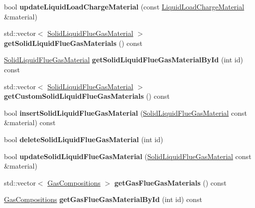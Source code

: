 \begin{DoxyCompactItemize}
bool {\bfseries update\+Liquid\+Load\+Charge\+Material} (const \hyperlink{class_liquid_load_charge_material}{Liquid\+Load\+Charge\+Material} \&material)
\item 
\mbox{\label{class_s_q_lite_aecba5bffe035af787b17b5bf5997d825}} 
std\+::vector$<$ \hyperlink{class_solid_liquid_flue_gas_material}{Solid\+Liquid\+Flue\+Gas\+Material} $>$ {\bfseries get\+Solid\+Liquid\+Flue\+Gas\+Materials} () const
\item 
\mbox{\label{class_s_q_lite_aa7ea5aa679227d695fe38848236281ee}} 
\hyperlink{class_solid_liquid_flue_gas_material}{Solid\+Liquid\+Flue\+Gas\+Material} {\bfseries get\+Solid\+Liquid\+Flue\+Gas\+Material\+By\+Id} (int id) const
\item 
\mbox{\label{class_s_q_lite_a23b34dae2fa12690d3718755fc373b42}} 
std\+::vector$<$ \hyperlink{class_solid_liquid_flue_gas_material}{Solid\+Liquid\+Flue\+Gas\+Material} $>$ {\bfseries get\+Custom\+Solid\+Liquid\+Flue\+Gas\+Materials} () const
\item 
\mbox{\label{class_s_q_lite_aa1de7450c37a07dfd0541fdf0dc164ef}} 
bool {\bfseries insert\+Solid\+Liquid\+Flue\+Gas\+Material} (\hyperlink{class_solid_liquid_flue_gas_material}{Solid\+Liquid\+Flue\+Gas\+Material} const \&material) const
\item 
\mbox{\label{class_s_q_lite_ac83353062d75af65c5b01d55570d0ead}} 
bool {\bfseries delete\+Solid\+Liquid\+Flue\+Gas\+Material} (int id)
\item 
\mbox{\label{class_s_q_lite_aed13c3aeeef3fdf7f3b2d72b61dd93e8}} 
bool {\bfseries update\+Solid\+Liquid\+Flue\+Gas\+Material} (\hyperlink{class_solid_liquid_flue_gas_material}{Solid\+Liquid\+Flue\+Gas\+Material} const \&material)
\item 
\mbox{\label{class_s_q_lite_a7f054c9a3a3954277c5de8d4048a40f9}} 
std\+::vector$<$ \hyperlink{class_gas_compositions}{Gas\+Compositions} $>$ {\bfseries get\+Gas\+Flue\+Gas\+Materials} () const
\item 
\mbox{\label{class_s_q_lite_a230049a94b9e2ff84d19fcd5a087954c}} 
\hyperlink{class_gas_compositions}{Gas\+Compositions} {\bfseries get\+Gas\+Flue\+Gas\+Material\+By\+Id} (int id) const

\end{DoxyCompactItemize}
